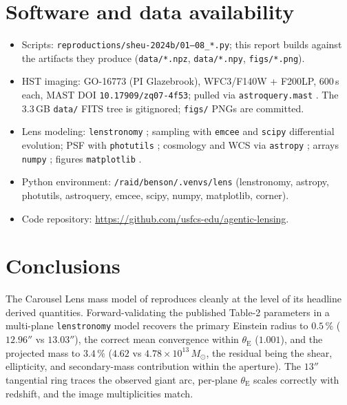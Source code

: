 \documentclass[11pt,letterpaper]{article}
\newcommand{\thetaE}{\ensuremath{\theta_{\mathrm{E}}}}
\newcommand{\Msun}{\ensuremath{M_\odot}}
\begin{document}
\section{Software and data availability}

\begin{itemize}
\item Scripts: \texttt{reproductions/sheu-2024b/01--08\_*.py}; this report
      builds against the artifacts they produce (\texttt{data/*.npz},
      \texttt{data/*.npy}, \texttt{figs/*.png}).
\item HST imaging: GO-16773 (PI Glazebrook), WFC3/F140W + F200LP, $600$\,s
      each, MAST DOI \texttt{10.17909/zq07-4f53}; pulled via
      \texttt{astroquery.mast} \autocite{astroquery2019}. The $3.3$\,GB
      \texttt{data/} FITS tree is gitignored; \texttt{figs/} PNGs are committed.
\item Lens modeling: \texttt{lenstronomy}
      \autocite{birrer2018lenstronomy,birrer2021lenstronomy2}; sampling with
      \texttt{emcee} \autocite{foremanmackey2013emcee} and \texttt{scipy}
      \autocite{virtanen2020scipy} differential evolution; PSF with
      \texttt{photutils} \autocite{bradley2024photutils}; cosmology and WCS via
      \texttt{astropy} \autocite{astropy2022}; arrays \texttt{numpy}
      \autocite{harris2020numpy}; figures \texttt{matplotlib}
      \autocite{hunter2007matplotlib}.
\item Python environment: \texttt{/raid/benson/.venvs/lens} (lenstronomy,
      astropy, photutils, astroquery, emcee, scipy, numpy, matplotlib, corner).
\item Code repository: \url{https://github.com/usfcs-edu/agentic-lensing}.
\end{itemize}

\section{Conclusions}

The Carousel Lens mass model of \citet{sheu2024carousel} reproduces cleanly at
the level of its headline derived quantities. Forward-validating the published
Table-2 parameters in a multi-plane \texttt{lenstronomy} model recovers the
primary Einstein radius to $0.5\,\%$ ($12.96''$ vs $13.03''$), the correct
mean convergence within $\thetaE$ ($1.001$), and the projected mass to
$3.4\,\%$ ($4.62$ vs $4.78\times10^{13}\,\Msun$, the residual being the shear,
ellipticity, and secondary-mass contribution within the aperture). The $13''$
tangential ring traces the observed giant arc, per-plane $\thetaE$ scales
correctly with redshift, and the image multiplicities match.
\end{document}
